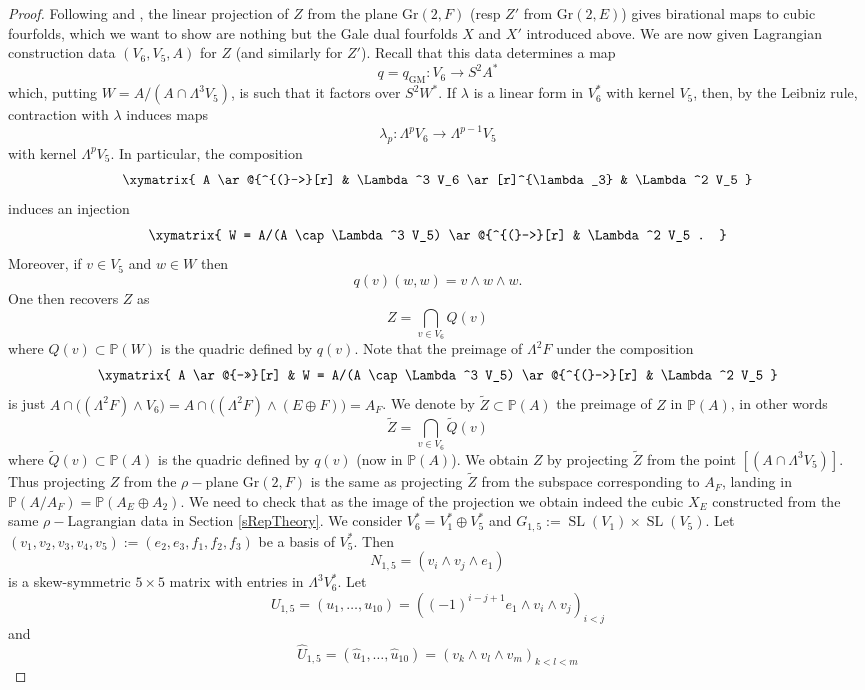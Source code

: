 \documentclass[11pt]{amsart}
\theoremstyle{plain}
\numberwithin{equation}{section}
\theoremstyle{definition}
\theoremstyle{remark}
\DeclareMathOperator{\SL}{SL}
\newcommand{\bP}{\mathbb{P}}
\newcommand{\Gr}{\mathrm{Gr}}
\begin{document}
\begin{proof}
Following \cite[Section 7.2]{DIM15} and \cite[Section 5]{KuzPerry}, the linear projection of $Z$ from the plane $\Gr(2,F)$ (resp $Z'$ from $\Gr(2,E)$) gives birational maps to cubic fourfolds, which we want to show are nothing but the Gale dual fourfolds $X$ and $X'$ introduced above. We are now given Lagrangian construction data $(V_6, V_5, A)$ for $Z$ (and similarly for $Z'$). Recall that this data determines a map
\[
q=q_{\mathrm{GM}}\colon V_6 \to S^2 A^*
\]
which, putting $W = A /(A \cap \Lambda^3 V_5)$, is such that it factors over $S^2 W^*$. If $\lambda$ is a linear form in $V_6^*$ with kernel $V_5$, then, by the Leibniz rule, contraction with $\lambda$ induces maps
\[
\lambda_p \colon \Lambda^p V_6 \to \Lambda^{p-1} V_5
\]
with kernel $\Lambda^p V_5$. In particular, the composition
\[
\xymatrix{
A \ar@{^{(}->}[r] & \Lambda^3 V_6 \ar[r]^{\lambda_3} & \Lambda^2 V_5
}
\]
induces an injection
\[
\xymatrix{
W = A/(A \cap \Lambda^3 V_5) \ar@{^{(}->}[r] & \Lambda^2 V_5 .
}
\]
Moreover, if $v\in V_5$ and $w\in W$ then 
\[
q(v)(w,w)= v\wedge w \wedge w . 
\]
One then recovers $Z$ as 
\[
Z = \bigcap_{v \in V_6} Q(v)
\]
where $Q(v) \subset \bP(W)$ is the quadric defined by $q(v)$. Note that the preimage of $\Lambda^2 F$ under the composition
\[
\xymatrix{
A \ar@{->>}[r] & W = A/(A \cap \Lambda^3 V_5) \ar@{^{(}->}[r] & \Lambda^2 V_5
}
\]
is just  $A \cap \bigl( (\Lambda^2 F)\wedge V_6 \bigr) = A \cap \bigl( (\Lambda^2 F)\wedge (E \oplus F) \bigr) = A_F$. We denote by $\widetilde{Z}\subset \bP (A)$ the preimage of $Z$ in $\bP(A)$, in other words
\[
\widetilde{Z} = \bigcap_{v \in V_6} \widetilde{Q}(v)
\]
where $\widetilde{Q}(v) \subset \bP(A)$ is the quadric defined by $q(v)$ (now in $\bP(A)$). 
We obtain $Z$ by projecting $\widetilde{Z}$ from the point $[(A \cap \Lambda^3 V_5)]$. 
Thus projecting $Z$ from the $\rho-$plane $\mathrm{Gr}(2, F)$ is the same as projecting $\widetilde{Z}$ from the subspace corresponding to $A_F$, landing in $\bP(A/A_F) =\bP (A_E \oplus A_2)$. 
We need to check that as the image of the projection we obtain indeed the cubic $X_E$ constructed from the same $\rho-$Lagrangian data in Section \ref{sRepTheory}. We consider $V_6^*=V_1^*\oplus V_5^*$ and $G_{1,5}:=\SL(V_1)\times \SL(V_5)$. Let $(v_1, v_2, v_3, v_4, v_5):=(e_2, e_3, f_1, f_2, f_3)$ be a basis of $V_5^*$. Then
\[
N_{1,5} = (v_i \wedge v_j \wedge e_1 )
\]
is a skew-symmetric $5\times 5$ matrix with entries in $\Lambda^3 V_6^*$. Let 
\[
U_{1,5} = (u_1, \dots , u_{10}) = ((-1)^{i-j+1}e_1\wedge v_i \wedge v_j )_{i<j}
\]
and 
\[
\widehat{U}_{1,5} = (\hat{u}_1, \dots , \hat{u}_{10}) = (v_k\wedge v_l \wedge v_m)_{k<l<m}
\]
\end{proof}
\end{document}
